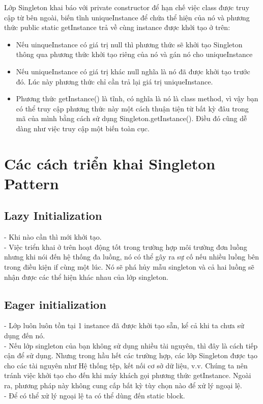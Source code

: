 Lớp Singleton khai báo với private constructor để hạn chế việc class được truy cập từ bên ngoài, biến tĩnh uniqueInstance để chứa thể hiện của nó và phương thức public static getInstance trả về cùng instance được khởi tạo ở trên:  

\begin{itemize}
\item Nếu uinqueInstance có giá trị null thì phương thức sẽ khởi tạo Singleton thông qua phương thức khởi tạo riêng của nó và gán nó cho uniqueInstance
\item Nếu uniqueInstance có giá trị khác null nghĩa là nó đã được khởi tạo trước đó. Lúc này phương thức chỉ cần trả lại giá trị uniqueInstance.
\item Phương thức getInstance() là tĩnh, có nghĩa là nó là class method, vì vậy bạn có thể truy cập phương thức này một cách thuận tiện từ bất kỳ đâu trong mã của mình bằng cách sử dụng Singleton.getInstance(). Điều đó cũng dễ dàng như việc truy cập một biến toàn cục. 
\end{itemize}

\section{Các cách triển khai Singleton Pattern}

\subsection{Lazy Initialization}
\noindent
- Khi nào cần thì mới khởi tạo.\\
- Việc triển khai ở trên hoạt động tốt trong trường hợp môi trường đơn luồng nhưng khi nói đến hệ thống đa luồng, nó có thể gây ra sự cố nếu nhiều luồng bên trong điều kiện if cùng một lúc. Nó sẽ phá hủy mẫu singleton và cả hai luồng sẽ nhận được các thể hiện khác nhau của lớp singleton.

\subsection{Eager initialization}
\noindent
- Lớp luôn luôn tồn tại 1 instance đã được khởi tạo sẵn, kể cả khi ta chưa sử dụng đến nó.\\
- Nếu lớp singleton của bạn không sử dụng nhiều tài nguyên, thì đây là cách tiếp cận để sử dụng. Nhưng trong hầu hết các trường hợp, các lớp Singleton được tạo cho các tài nguyên như Hệ thống tệp, kết nối cơ sở dữ liệu, v.v. Chúng ta nên tránh việc khởi tạo cho đến khi máy khách gọi phương thức getInstance. Ngoài ra, phương pháp này không cung cấp bất kỳ tùy chọn nào để xử lý ngoại lệ.\\
- Để có thể xử lý ngoại lệ ta có thể dùng đến static block.

